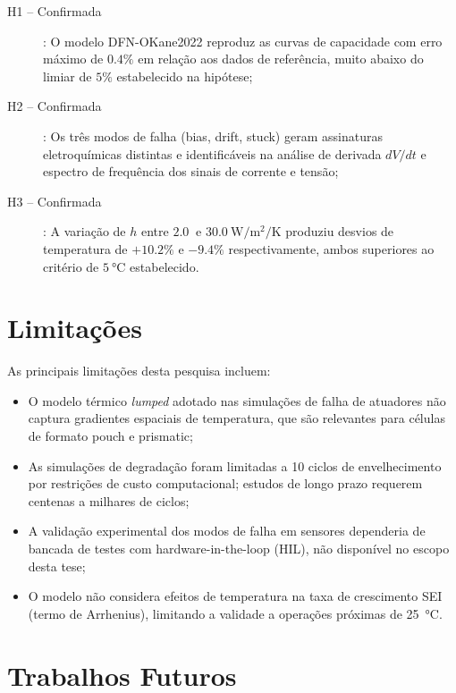 \documentclass[
    12pt,
    openright,
    twoside,
    a4paper,
    brazil,
    english
]{abntex2}
\begin{document}
\begin{description}
  \item[H1 -- Confirmada]: O modelo DFN-OKane2022 reproduz as curvas de
        capacidade com erro máximo de $0.4\%$ em relação aos dados de referência,
        muito abaixo do limiar de $5\%$ estabelecido na hipótese;

  \item[H2 -- Confirmada]: Os três modos de falha (bias, drift, stuck) geram
        assinaturas eletroquímicas distintas e identificáveis na análise de
        derivada $dV/dt$ e espectro de frequência dos sinais de corrente e tensão;

  \item[H3 -- Confirmada]: A variação de $h$ entre $\SI{2.0}{}$ e
        $\SI{30.0}{\watt\per\meter\squared\per\kelvin}$ produziu desvios de
        temperatura de $+10.2\%$ e $-9.4\%$ respectivamente, ambos superiores
        ao critério de $\SI{5}{\celsius}$ estabelecido.
\end{description}

\section{Limitações}

As principais limitações desta pesquisa incluem:

\begin{itemize}
  \item O modelo térmico \textit{lumped} adotado nas simulações de falha de
        atuadores não captura gradientes espaciais de temperatura, que são
        relevantes para células de formato pouch e prismatic;
  \item As simulações de degradação foram limitadas a 10 ciclos de envelhecimento
        por restrições de custo computacional; estudos de longo prazo requerem
        centenas a milhares de ciclos;
  \item A validação experimental dos modos de falha em sensores dependeria de
        bancada de testes com hardware-in-the-loop (HIL), não disponível no
        escopo desta tese;
  \item O modelo não considera efeitos de temperatura na taxa de crescimento SEI
        (termo de Arrhenius), limitando a validade a operações próximas de
        \SI{25}{\celsius}.
\end{itemize}

\section{Trabalhos Futuros}
\end{document}
